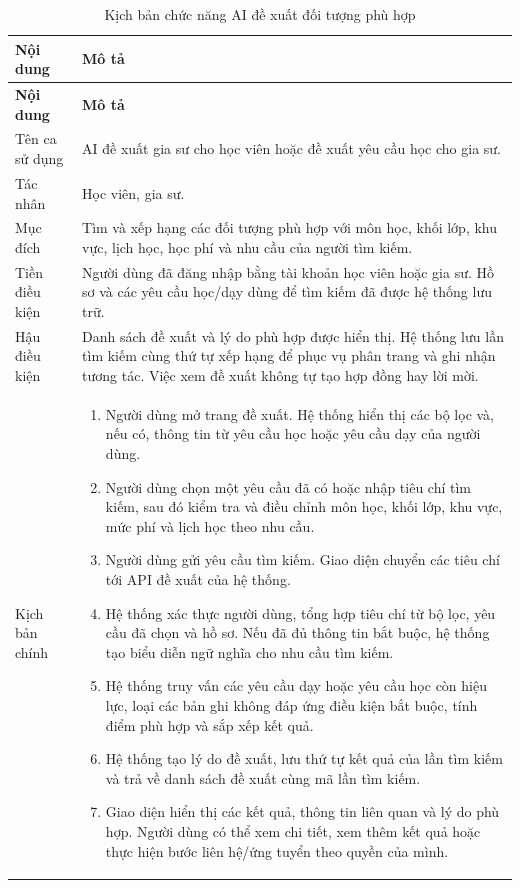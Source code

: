 \begin{longtable}{|p{}|p{}|}
\caption{Kịch bản chức năng AI đề xuất đối tượng phù hợp}\label{tab:ai-de-xuat}\\
\hline
\textbf{Nội dung} & \textbf{Mô tả} \\ \hline
\endfirsthead
\hline
\textbf{Nội dung} & \textbf{Mô tả} \\ \hline
\endhead
Tên ca sử dụng & AI đề xuất gia sư cho học viên hoặc đề xuất yêu cầu học cho gia sư. \\ \hline
Tác nhân & Học viên, gia sư. \\ \hline
Mục đích & Tìm và xếp hạng các đối tượng phù hợp với môn học, khối lớp, khu vực, lịch học, học phí và nhu cầu của người tìm kiếm. \\ \hline
Tiền điều kiện & Người dùng đã đăng nhập bằng tài khoản học viên hoặc gia sư. Hồ sơ và các yêu cầu học/dạy dùng để tìm kiếm đã được hệ thống lưu trữ. \\ \hline
Hậu điều kiện & Danh sách đề xuất và lý do phù hợp được hiển thị. Hệ thống lưu lần tìm kiếm cùng thứ tự xếp hạng để phục vụ phân trang và ghi nhận tương tác. Việc xem đề xuất không tự tạo hợp đồng hay lời mời. \\ \hline
Kịch bản chính &
\begin{enumerate}[leftmargin=*,nosep]
  \item Người dùng mở trang đề xuất. Hệ thống hiển thị các bộ lọc và, nếu có, thông tin từ yêu cầu học hoặc yêu cầu dạy của người dùng.
  \item Người dùng chọn một yêu cầu đã có hoặc nhập tiêu chí tìm kiếm, sau đó kiểm tra và điều chỉnh môn học, khối lớp, khu vực, mức phí và lịch học theo nhu cầu.
  \item Người dùng gửi yêu cầu tìm kiếm. Giao diện chuyển các tiêu chí tới API đề xuất của hệ thống.
  \item Hệ thống xác thực người dùng, tổng hợp tiêu chí từ bộ lọc, yêu cầu đã chọn và hồ sơ. Nếu đã đủ thông tin bắt buộc, hệ thống tạo biểu diễn ngữ nghĩa cho nhu cầu tìm kiếm.
  \item Hệ thống truy vấn các yêu cầu dạy hoặc yêu cầu học còn hiệu lực, loại các bản ghi không đáp ứng điều kiện bắt buộc, tính điểm phù hợp và sắp xếp kết quả.
  \item Hệ thống tạo lý do đề xuất, lưu thứ tự kết quả của lần tìm kiếm và trả về danh sách đề xuất cùng mã lần tìm kiếm.
  \item Giao diện hiển thị các kết quả, thông tin liên quan và lý do phù hợp. Người dùng có thể xem chi tiết, xem thêm kết quả hoặc thực hiện bước liên hệ/ứng tuyển theo quyền của mình.

\end{enumerate}
\end{longtable}
